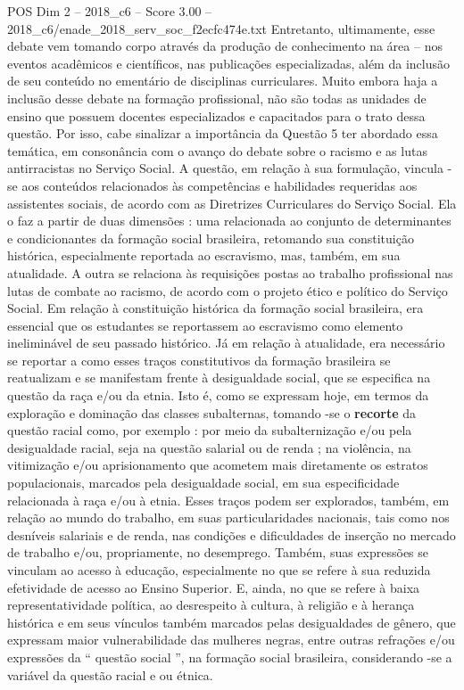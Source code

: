 \begin{textsample}{POS Dim 2 – 2018\_c6 – Score 3.00 – 2018\_c6/enade\_2018\_serv\_soc\_f2ecfc474e.txt}
Entretanto, ultimamente, esse debate vem tomando corpo através da produção de conhecimento na área – nos eventos acadêmicos e científicos, nas publicações especializadas, além da inclusão de seu conteúdo no ementário de disciplinas curriculares.
Muito embora haja a inclusão desse debate na formação profissional, não são todas as unidades de ensino que possuem docentes especializados e capacitados para o trato dessa questão.
Por isso, cabe sinalizar a importância da Questão 5 ter abordado essa temática, em consonância com o avanço do debate sobre o racismo e as lutas antirracistas no Serviço Social.
A questão, em relação à sua formulação, vincula -se aos conteúdos relacionados às competências e habilidades requeridas aos assistentes sociais, de acordo com as Diretrizes Curriculares do Serviço Social.
Ela o faz a partir de duas dimensões : uma relacionada ao conjunto de determinantes e condicionantes da formação social brasileira, retomando sua constituição histórica, especialmente reportada ao escravismo, mas, também, em sua atualidade.
A outra se relaciona às requisições postas ao trabalho profissional nas lutas de combate ao racismo, de acordo com o projeto ético e político do Serviço Social.
Em relação à constituição histórica da formação social brasileira, era essencial que os estudantes se reportassem ao escravismo como elemento ineliminável de seu passado histórico.
Já em relação à atualidade, era necessário se reportar a como esses traços constitutivos da formação brasileira se reatualizam e se manifestam frente à desigualdade social, que se especifica na questão da raça e/ou da etnia.
Isto é, como se expressam hoje, em termos da exploração e dominação das classes subalternas, tomando -se o \textbf{recorte} da questão racial como, por exemplo : por meio da subalternização e/ou pela desigualdade racial, seja na questão salarial ou de renda ; na violência, na vitimização e/ou aprisionamento que acometem mais diretamente os estratos populacionais, marcados pela desigualdade social, em sua especificidade relacionada à raça e/ou à etnia.
Esses traços podem ser explorados, também, em relação ao mundo do trabalho, em suas particularidades nacionais, tais como nos desníveis salariais e de renda, nas condições e dificuldades de inserção no mercado de trabalho e/ou, propriamente, no desemprego.
Também, suas expressões se vinculam ao acesso à educação, especialmente no que se refere à sua reduzida efetividade de acesso ao Ensino Superior.
E, ainda, no que se refere à baixa representatividade política, ao desrespeito à cultura, à religião e à herança histórica e em seus vínculos também marcados pelas desigualdades de gênero, que expressam maior vulnerabilidade das mulheres negras, entre outras refrações e/ou expressões da “ questão social ”, na formação social brasileira, considerando -se a variável da questão racial e ou étnica.

\end{textsample}
